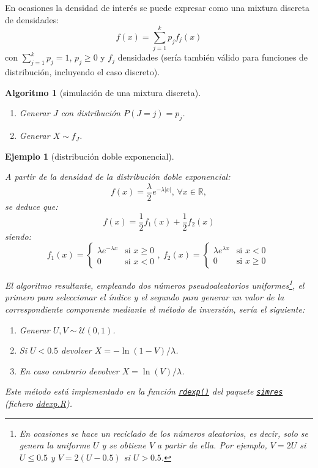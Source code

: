\documentclass[
]{book}
\theoremstyle{break}
\newtheorem{conjecture}{Algoritmo}[chapter]
\newtheorem{example}{Ejemplo}[chapter]
\theoremstyle{nonumberplain}
\begin{document}
En ocasiones la densidad de interés se puede expresar como una mixtura discreta de densidades:
\[f(x)=\sum_{j=1}^{k}p_{j}f_{j}(x)\]
con \(\sum_{j=1}^{k}p_j=1\), \(p_j\geq 0\) y \(f_j\) densidades (sería también válido para funciones de distribución, incluyendo el caso discreto).

\begin{conjecture}[simulación de una mixtura discreta]
\protect\hypertarget{cnj:mixtura-discreta}{}\label{cnj:mixtura-discreta}

\begin{enumerate}
\def\labelenumi{\arabic{enumi}.}
\item
  Generar \(J\) con distribución \(P\left( J=j \right) = p_j\).
\item
  Generar \(X\sim f_J\).
\end{enumerate}

\end{conjecture}

\begin{example}[distribución doble exponencial]
\protect\hypertarget{exm:dexp-mix}{}\label{exm:dexp-mix}

A partir de la densidad de la distribución doble exponencial:
\[f(x) =\frac{\lambda }{2}e^{-\lambda \left\vert x\right\vert } \text{, }\forall x\in \mathbb{R},\]
se deduce que:
\[f(x) = \frac{1}{2}f_{1}(x) + \frac{1}{2}f_{2}(x)\]
siendo:
\[f_{1}(x) = \left\{ 
\begin{array}{ll}
\lambda e^{-\lambda x} & \text{si } x\geq 0 \\ 
0 & \text{si } x<0
\end{array}
\right., \  
f_{2}(x) = \left\{ 
\begin{array}{ll}
\lambda e^{\lambda x} & \text{si } x<0 \\ 
0 & \text{si } x\geq 0
\end{array}
\ \right.\]

El algoritmo resultante, empleando dos números pseudoaleatorios uniformes\footnote{En ocasiones se hace un reciclado de los números aleatorios, es decir, solo se genera la uniforme \(U\) y se obtiene \(V\) a partir de ella. Por ejemplo, \(V=2U\) si \(U \le 0.5\) y \(V=2(U-0.5)\) si \(U > 0.5\).}, el primero para seleccionar el índice y el segundo para generar un valor de la correspondiente componente mediante el método de inversión, sería el siguiente:

\begin{enumerate}
\def\labelenumi{\arabic{enumi}.}
\item
  Generar \(U,V \sim \mathcal{U}(0, 1)\).
\item
  Si \(U<0.5\) devolver \(X= -\ln( 1-V )/\lambda\).
\item
  En caso contrario devolver \(X= \ln(V)/\lambda\).
\end{enumerate}

Este método está implementado en la función \href{https://rubenfcasal.github.io/simres/reference/ddexp.html}{\texttt{rdexp()}} del paquete \href{https://rubenfcasal.github.io/simres}{\texttt{simres}} (fichero \href{R/ddexp.R}{\emph{ddexp.R}}).
\end{example}
\end{document}
